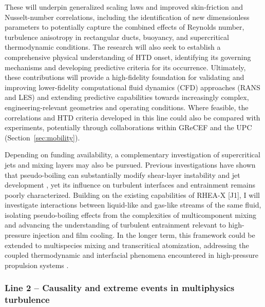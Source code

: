 \documentclass[11pt]{article}
\begin{document}
These will underpin generalized scaling laws and improved skin-friction and Nusselt-number correlations, including the identification of new dimensionless parameters to potentially capture the combined effects of Reynolds number, turbulence anisotropy in rectangular ducts, buoyancy, and supercritical thermodynamic conditions.
The research will also seek to establish a comprehensive physical understanding of HTD onset, identifying its governing mechanisms and developing predictive criteria for its occurrence.
Ultimately, these contributions will provide a high-fidelity foundation for validating and improving lower-fidelity computational fluid dynamics (CFD) approaches (RANS and LES) and extending predictive capabilities towards increasingly complex, engineering-relevant geometries and operating conditions.
Where feasible, the correlations and HTD criteria developed in this line could also be compared with experiments, potentially through collaborations within GReCEF and the UPC (Section~\ref{sec:mobility}).

Depending on funding availability, a complementary investigation of supercritical jets and mixing layers may also be pursued.
Previous investigations have shown that pseudo-boiling can substantially modify shear-layer instability and jet development \cite{Lapenna2019,SharanBellan2021}, yet its influence on turbulent interfaces and entrainment remains poorly characterized.
Building on the existing capabilities of RHEA-X [J1], I will investigate interactions between liquid-like and gas-like streams of the same fluid, isolating pseudo-boiling effects from the complexities of multicomponent mixing and advancing the understanding of turbulent entrainment relevant to high-pressure injection and film cooling.
In the longer term, this framework could be extended to multispecies mixing and transcritical atomization, addressing the coupled thermodynamic and interfacial phenomena encountered in high-pressure propulsion systems \cite{JofreUrzay2021}.

\subsubsection{Line 2 -- Causality and extreme events in multiphysics turbulence}
\end{document}
